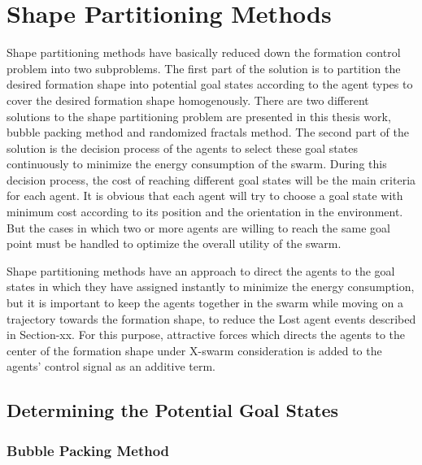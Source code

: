 \documentclass[twoside]{article}
\begin{document}
			
			
		\section{Shape Partitioning Methods}
			
			Shape partitioning methods have basically reduced down the formation control problem into two subproblems. The first part of the solution is to partition the desired formation shape into potential goal states according to the agent types to cover the desired formation shape homogenously. There are two different solutions to the shape partitioning problem are presented in this thesis work, bubble packing method and randomized fractals method. The second part of the solution is the decision process of the agents to select these goal states continuously to minimize the energy consumption of the swarm. During this decision process, the cost of reaching different goal states will be the main criteria for each agent. It is obvious that each agent will try to choose a goal state with minimum cost according to its position and the orientation in the environment. But the cases in which two or more agents are willing to reach the same goal point must be handled to optimize the overall utility of the swarm. 


Shape partitioning methods have an approach to direct the agents to the goal states in which they have assigned instantly to minimize the energy consumption, but it is important to keep the agents together in the swarm while moving on a trajectory towards the formation shape, to reduce the Lost agent events described in Section-xx. For this purpose, attractive forces which directs the agents to the center of the formation shape under X-swarm consideration is added to the agents' control signal as an additive term. 
			
			\subsection{Determining the Potential Goal States}
			\subsubsection{Bubble Packing Method}
			
\end{document}

